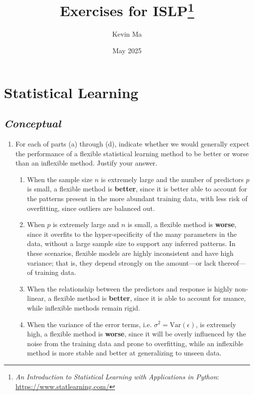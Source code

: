 \documentclass{article}
\title{Exercises for ISLP\footnote{\textit{An Introduction to
    Statistical Learning with Applications in Python}:
\url{https://www.statlearning.com/}}}
\author{Kevin Ma}
\date{May 2025}
\begin{document}
\maketitle

\setcounter{section}{1}

\section{Statistical Learning}

\subsection*{\textit{Conceptual}}

\begin{enumerate}
  \item For each of parts (a) through (d), indicate whether we would generally
    expect the performance of a flexible statistical learning method to be
    better or worse than an inflexible method. Justify your answer.
    \begin{enumerate}
      \item When the sample size $n$ is extremely large and the
        number of predictors $p$ is small, a flexible method is
        \textbf{better}, since it is better able to account for the
        patterns present in the more abundant training data, with
        less risk of overfitting, since outliers are balanced out.
      \item When $p$ is extremely large and $n$ is small, a flexible
        method is \textbf{worse}, since it overfits to the
        hyper-specificity of the many parameters in the data, without
        a large sample size to support any inferred patterns. In
        these scenarios, flexible models are highly inconsistent and
        have high variance; that is, they depend strongly on the
        amount---or lack thereof---of training data.
      \item When the relationship between the predictors and response
        is highly non-linear, a flexible method is \textbf{better},
        since it is able to account for nuance, while inflexible
        methods remain rigid.
      \item When the variance of the error terms, i.e. $\sigma^2 =
        \text{Var}(\epsilon)$, is extremely high, a flexible method
        is \textbf{worse}, since it will be overly influenced by the
        noise from the training data and prone to overfitting, while
        an inflexible method is more stable and better at
        generalizing to unseen data.
    \end{enumerate}


\end{enumerate}
\end{document}
